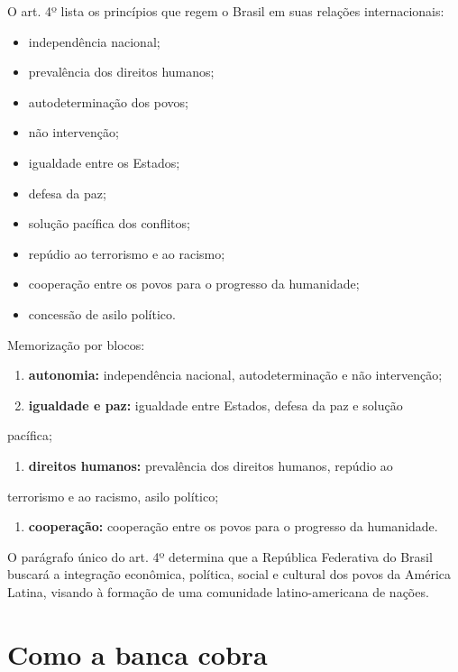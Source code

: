 \documentclass[11pt,a4paper]{article}
\begin{document}
O art. 4º lista os princípios que regem o Brasil em suas relações internacionais:

\begin{itemize}
  \item independência nacional;
  \item prevalência dos direitos humanos;
  \item autodeterminação dos povos;
  \item não intervenção;
  \item igualdade entre os Estados;
  \item defesa da paz;
  \item solução pacífica dos conflitos;
  \item repúdio ao terrorismo e ao racismo;
  \item cooperação entre os povos para o progresso da humanidade;
  \item concessão de asilo político.
\end{itemize}

Memorização por blocos:

\begin{enumerate}
  \item \textbf{autonomia:} independência nacional, autodeterminação e não intervenção;
  \item \textbf{igualdade e paz:} igualdade entre Estados, defesa da paz e solução
\end{enumerate}

   pacífica;

\begin{enumerate}
  \item \textbf{direitos humanos:} prevalência dos direitos humanos, repúdio ao
\end{enumerate}

   terrorismo e ao racismo, asilo político;

\begin{enumerate}
  \item \textbf{cooperação:} cooperação entre os povos para o progresso da humanidade.
\end{enumerate}

O parágrafo único do art. 4º determina que a República Federativa do Brasil buscará a integração econômica, política, social e cultural dos povos da América Latina, visando à formação de uma comunidade latino-americana de nações.

\section*{Como a banca cobra}
\end{document}
